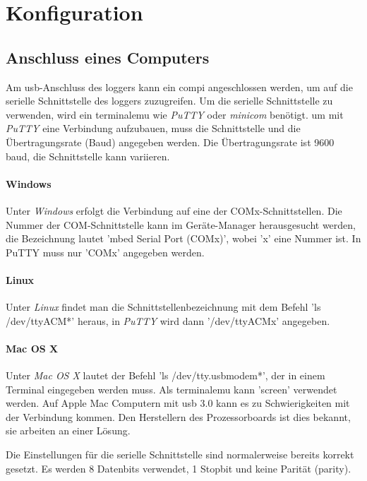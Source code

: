 \section{Konfiguration}\label{sec.manualkonfig}


\subsection{Anschluss eines Computers}\label{ssec.manualserial}
Am \gls{usb}-Anschluss des \gls{logger}s kann ein \gls{compi} angeschlossen werden, um auf die serielle Schnittstelle des \gls{logger}s zuzugreifen. Um die serielle Schnittstelle zu verwenden, wird ein \gls{terminalemu} wie \emph{PuTTY} oder \emph{minicom} benötigt. um mit \emph{PuTTY} eine Verbindung aufzubauen, muss die Schnittstelle und die Übertragungsrate (Baud) angegeben werden. Die Übertragungsrate ist 9600 baud, die Schnittstelle kann variieren. 

\paragraph{Windows} Unter \emph{Windows} erfolgt die Verbindung auf eine der COMx-Schnittstellen. Die Nummer der COM-Schnittstelle kann im Geräte-Manager herausgesucht werden, die Bezeichnung lautet 'mbed Serial Port (COMx)', wobei 'x' eine Nummer ist. In PuTTY muss nur 'COMx' angegeben werden.

\paragraph{Linux} Unter \emph{Linux} findet man die Schnittstellenbezeichnung mit dem Befehl 'ls /dev/ttyACM*' heraus, in \emph{PuTTY} wird dann '/dev/ttyACMx' angegeben. 

\paragraph{Mac OS X} Unter \emph{Mac OS X} lautet der Befehl 'ls /dev/tty.usbmodem*', der in einem Terminal eingegeben werden muss. Als \gls{terminalemu} kann 'screen' verwendet werden. Auf Apple Mac Computern mit \gls{usb} 3.0 kann es zu Schwierigkeiten mit der Verbindung kommen. Den Herstellern des Prozessorboards ist dies bekannt, sie arbeiten an einer Lösung.

Die Einstellungen für die serielle Schnittstelle sind normalerweise bereits korrekt gesetzt. Es werden 8 Datenbits verwendet, 1 Stopbit und keine Parität (parity).


